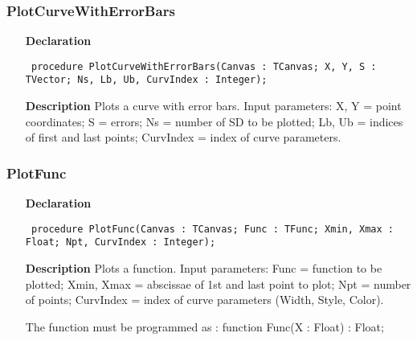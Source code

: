 \documentclass[12pt,a4paper,oneside]{report}
\newcommand{\declarationitem}[1]{\textbf{#1}}
\newcommand{\descriptiontitle}[1]{\textbf{#1}}
\newcommand{\code}[1]{\texttt{#1}}
\begin{document}
\subsubsection{PlotCurveWithErrorBars}
\label{uwinplot-PlotCurveWithErrorBars}
\begin{itemize}\item[\declarationitem{Declaration}\hfill]
	\begin{flushleft}
		\code{
			procedure PlotCurveWithErrorBars(Canvas : TCanvas; X, Y, S : TVector; Ns, Lb, Ub, CurvIndex : Integer);}
		
	\end{flushleft}
	
	\par
	\item[\descriptiontitle{Description}]
	Plots a curve with error bars. Input parameters: X, Y = point coordinates; S = errors; Ns = number of SD to be plotted; Lb, Ub = indices of first and last points; CurvIndex = index of curve parameters.
	
\end{itemize}
\subsubsection{PlotFunc}
\label{uwinplot-PlotFunc}
\begin{itemize}\item[\declarationitem{Declaration}\hfill]
	\begin{flushleft}
		\code{
			procedure PlotFunc(Canvas : TCanvas; Func : TFunc; Xmin, Xmax : Float; Npt, CurvIndex : Integer);}
		
	\end{flushleft}
	
	\par
	\item[\descriptiontitle{Description}]
	Plots a function. Input parameters: Func = function to be plotted; Xmin, Xmax = abscissae of 1st and last point to plot; Npt = number of points; CurvIndex = index of curve parameters (Width, Style, Color).
	
	The function must be programmed as : function Func(X : Float) : Float;
	
\end{itemize}
\end{document}
